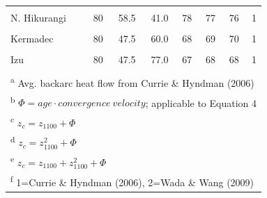 \documentclass[draft,linenumbers]{agujournal2018} %
\providecommand{\DIFaddend}{} %
\DeclareRobustCommand{\DIFaddend}{\DIFOaddend \let\includegraphics\DIFOincludegraphics} %
\begin{document}
\begin{table}
\begin{tabular}[t]{lrrrrrrr}
\addlinespace
\cellcolor{gray!6}{Aleutians} & \cellcolor{gray!6}{75} & \cellcolor{gray!6}{51.6} & \cellcolor{gray!6}{39.6} & \cellcolor{gray!6}{73} & \cellcolor{gray!6}{73} & \cellcolor{gray!6}{73} & \cellcolor{gray!6}{1}\\
N. Hikurangi & 80 & 58.5 & 41.0 & 78 & 77 & 76 & 1\\
\cellcolor{gray!6}{Mariana} & \cellcolor{gray!6}{80} & \cellcolor{gray!6}{47.5} & \cellcolor{gray!6}{54.6} & \cellcolor{gray!6}{69} & \cellcolor{gray!6}{70} & \cellcolor{gray!6}{70} & \cellcolor{gray!6}{1}\\
Kermadec & 80 & 47.5 & 60.0 & 68 & 69 & 70 & 1\\
\cellcolor{gray!6}{Kamchatka} & \cellcolor{gray!6}{70} & \cellcolor{gray!6}{80.2} & \cellcolor{gray!6}{77.0} & \cellcolor{gray!6}{89} & \cellcolor{gray!6}{88} & \cellcolor{gray!6}{88} & \cellcolor{gray!6}{1}\\
\addlinespace
Izu & 80 & 47.5 & 77.0 & 67 & 68 & 68 & 1\\
\cellcolor{gray!6}{NE Japan} & \cellcolor{gray!6}{88} & \cellcolor{gray!6}{47.7} & \cellcolor{gray!6}{107.9} & \cellcolor{gray!6}{64} & \cellcolor{gray!6}{65} & \cellcolor{gray!6}{65} & \cellcolor{gray!6}{1}\\
\bottomrule
\multicolumn{8}{l}{\rule{0pt}{1em}\textsuperscript{a} Avg. backarc heat flow from Currie \& Hyndman (2006)}\\
\multicolumn{8}{l}{\rule{0pt}{1em}\textsuperscript{b} $\Phi=age \cdot convergence~velocity$; applicable to Equation 4}\\
\multicolumn{8}{l}{\rule{0pt}{1em}\textsuperscript{c} $z_c=z_{1100}+\Phi$}\\
\multicolumn{8}{l}{\rule{0pt}{1em}\textsuperscript{d} $z_c=z_{1100}^2+\Phi$}\\
\multicolumn{8}{l}{\rule{0pt}{1em}\textsuperscript{e} $z_c=z_{1100}+z_{1100}^2+\Phi$}\\
\multicolumn{8}{l}{\rule{0pt}{1em}\textsuperscript{f} 1=Currie \& Hyndman (2006), 2=Wada \& Wang (2009)}\\
\end{tabular}
\end{table}
\DIFaddend
\end{document}
